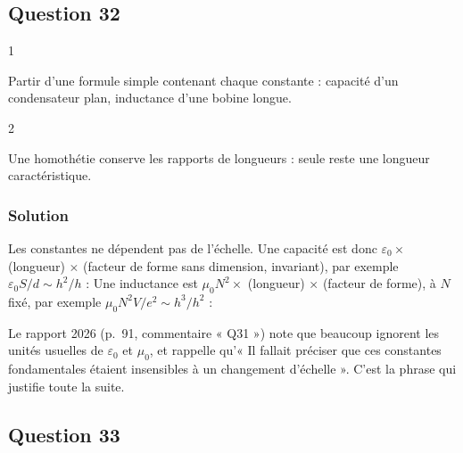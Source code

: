 \documentclass[11pt,a4paper]{article}
\newcommand{\equationajustee}[1]{%
  \sbox{\boiteequation}{$\displaystyle #1$}%
  \ifdim\wd\boiteequation>\linewidth
    \[\resizebox{\linewidth}{!}{\usebox{\boiteequation}}\]%
  \else
    \[#1\]%
  \fi}
\begin{document}
\hypertarget{question-32}{%
\subsection{Question 32}\label{question-32}}

\begin{indication}{1}

Partir d'une formule simple contenant chaque constante : capacité d'un condensateur plan, inductance d'une bobine longue.

\end{indication}

\begin{indication}{2}

Une homothétie conserve les rapports de longueurs : seule reste une longueur caractéristique.

\end{indication}

\hypertarget{solution-31}{%
\subsubsection{Solution}\label{solution-31}}

\equationajustee{\boxed{\begin{aligned}{}&[\varepsilon_0]=\text{F}\cdot\text{m}^{-1}\\
&[\mu_0]=\text{H}\cdot\text{m}^{-1}
\end{aligned}}}
Les constantes ne dépendent pas de l'échelle. Une capacité est donc \(\varepsilon_0\times\) (longueur) \(\times\) (facteur de forme sans dimension, invariant), par exemple \(\varepsilon_0S/d\sim h^2/h\) :
\equationajustee{\boxed{C\sim h}}
Une inductance est \(\mu_0N^2\times\) (longueur) \(\times\) (facteur de forme), à \(N\) fixé, par exemple \(\mu_0N^2V/e^2\sim h^3/h^2\) :
\equationajustee{\boxed{L\sim h}}

\begin{jury}

Le rapport 2026 (p.~91, commentaire « Q31 ») note que beaucoup ignorent les unités usuelles de \(\varepsilon_0\) et \(\mu_0\), et rappelle qu'« Il fallait préciser que ces constantes fondamentales étaient insensibles à un changement d'échelle ». C'est la phrase qui justifie toute la suite.

\end{jury}

\hypertarget{question-33}{%
\subsection{Question 33}\label{question-33}}
\end{document}
